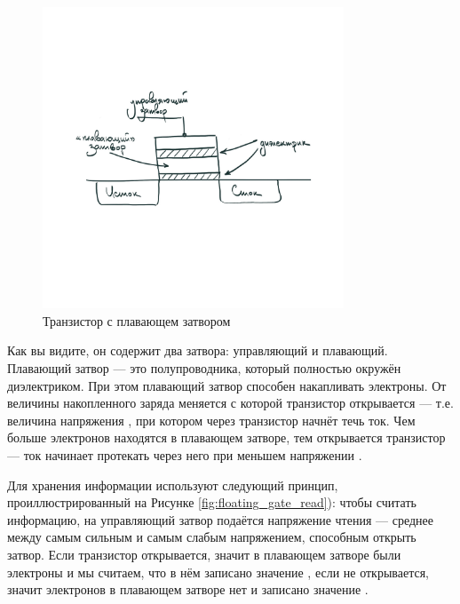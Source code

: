 \begin{figure}[H]
\centering
% 
\includegraphics[width=0.8\textwidth]{images/lab_6/floating_gate_transistor}
\caption{Транзистор с плавающем затвором}
\label{fig:floating_gate_transistor}
\end{figure}

\par{Как вы видите, он содержит два затвора: управляющий и плавающий. Плавающий затвор --- это полупроводника, который полностью окружён диэлектриком. При этом плавающий затвор способен накапливать электроны. От величины накопленного заряда меняется  с которой транзистор открывается --- т.е. величина напряжения , при котором через транзистор начнёт течь ток. Чем больше электронов находятся в плавающем затворе, тем  открывается транзистор --- ток начинает протекать через него при меньшем напряжении .}

\par{Для хранения информации используют следующий принцип, проиллюстрированный на Рисунке \ref{fig:floating_gate_read}): чтобы считать информацию, на управляющий затвор подаётся напряжение чтения --- среднее между самым сильным и самым слабым напряжением, способным открыть затвор. Если транзистор открывается, значит в плавающем затворе были электроны и мы считаем, что в нём записано значение , если не открывается, значит электронов в плавающем затворе нет и записано значение .}

